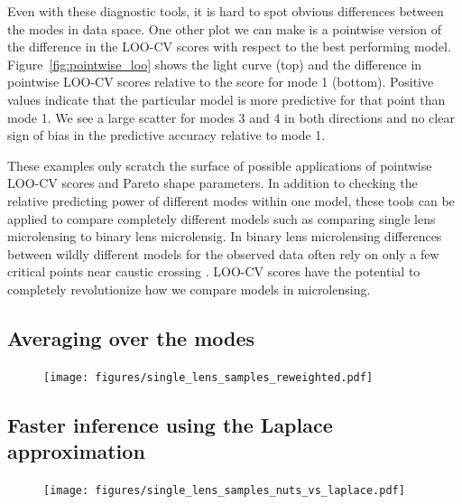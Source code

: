 \documentclass[12pt,dvipsnames]{report}
\begin{document}
Even with these diagnostic tools, it is hard to spot obvious differences between the 
modes in data space. One other plot we can make is a pointwise version of the 
difference in the LOO-CV scores with respect to the best performing model.
Figure~\ref{fig:pointwise_loo} shows the light curve (top) and the difference in 
pointwise LOO-CV scores relative to the score for mode 1 (bottom). Positive values 
indicate that the particular model is more predictive for that point than mode 1. 
We see a large scatter for modes 3 and 4 in both directions and no clear sign 
of bias in the predictive accuracy relative to mode 1. 

These examples only scratch the surface of possible applications of pointwise 
LOO-CV scores and Pareto shape parameters.
In addition to checking the relative predicting power of different modes within one 
model, these tools can be applied to compare completely different models such as comparing 
single lens microlensing to binary lens microlensig. In binary lens microlensing 
differences between wildly different models for the observed data often rely on only a 
few critical points near caustic crossing 
\citep[see for example Figure 1 in ][[]{2018AJ....155..259H}. LOO-CV scores have 
the potential to completely  revolutionize how we compare models in microlensing.

\subsection{Averaging over the modes}


\begin{figure}[t]
    \begin{centering}
        \texttt{[image: figures/single\_lens\_samples\_reweighted.pdf]}
        \caption{}
            \label{fig:ogle_lightcurve_fit_samples_reweighted}
    \end{centering}
\end{figure}

\subsection{Faster inference using the Laplace approximation}

\begin{figure}[t]
    \begin{centering}
        \texttt{[image: figures/single\_lens\_samples\_nuts\_vs\_laplace.pdf]}
        \caption{}
            \label{fig:ogle_lightcurve_fit_nuts_vs_laplace}
    \end{centering}
\end{figure}
\end{document}

